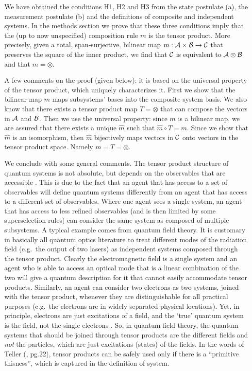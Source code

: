\documentclass[aps,prl,amsmath,amssymb,twocolumn,nofootinbib]{revtex4}
\theoremstyle{plain}
\theoremstyle{definition}
\theoremstyle{remark}
\begin{document}
	We have obtained the conditions H1, H2 and H3 from the state postulate
	(a), the measurement postulate (b) and the definitions of composite
	and independent systems. In the methods section we prove that these
	three conditions imply that the (up to now unspecified) composition
	rule $m$ is the tensor product. More precisely, given a total,
	span-surjective, bilinear map $m:{\cal A}\times{\cal B}\to{\cal C}$
	that preserves the square of the inner product, we find that $\cal C $
	is equivalent to $\cal A \otimes \cal B $ and that $m=\otimes$.
	
	
	A few comments on the proof (given below): it is based on the universal
	property of the tensor product, which uniquely characterizes it. First
	we show that the bilinear map $m$ maps subsystems' bases into the
	composite system basis. We also know that there exists a tensor
	product map $ {T}=\otimes$ that can compose the vectors in $\cal A$
	and $\cal B$.  Then we use the universal property: since $m$ is a
	bilinear map, we are assured that there exists a unique $\hat m$ such
	that $\hat m \circ T=m$. Since we show that $\hat m$ is an
	isomorphism, then $\hat{m}$ bijectively maps vectors in $\cal C$ onto
	vectors in the tensor product space. Namely $m={T}=\otimes$.
	
	We conclude with some general comments. The tensor product structure
	of quantum systems is not absolute, but depends on the observables
	that are accessible \cite{zanardi,zanardilloyd}. This is due to the
	fact that an agent that has access to a set of observables will define
	quantum systems differently from an agent that has access to a
	different set of observables. Where one agent sees a single system, an
	agent that has access to less refined observables (and is then limited
	by some superselection rules) can consider the same system as composed
	of multiple subsystems. A typical example \cite{tellerbook} comes from
	quantum field theory. It is customary in basically all quantum optics
	literature to treat different modes of the radiation field (e.g.~the
	output of two lasers) as independent systems composed through the
	tensor product.  Clearly the electromagnetic field is a single system
	and an agent who is able to access an optical mode that is a linear
	combination of the two will give a quantum description for it that
	cannot easily accommodate tensor products. Similarly, an agent can
	consider two electrons as two systems, joined with the tensor product,
	whenever they are distinguishable for all practical purposes (e.g.~the
	electrons are in widely separated physical locations). Yet, in
	principle, electrons are just excitations of a field, and the `true'
	quantum system is the field, not the single electrons
	\cite{teller,tellerbook}.  So, in quantum field theory, the quantum
	systems that should be joined through tensor products are the
	different fields and {\em not} the particles, which are just
	excitations (states) of the fields. In the words of Teller
	(\cite{tellerbook}, pg.22), tensor products can be safely used only if
	there is a ``primitive thisness'', which is captured in the definition
	of system.
	
\end{document}
